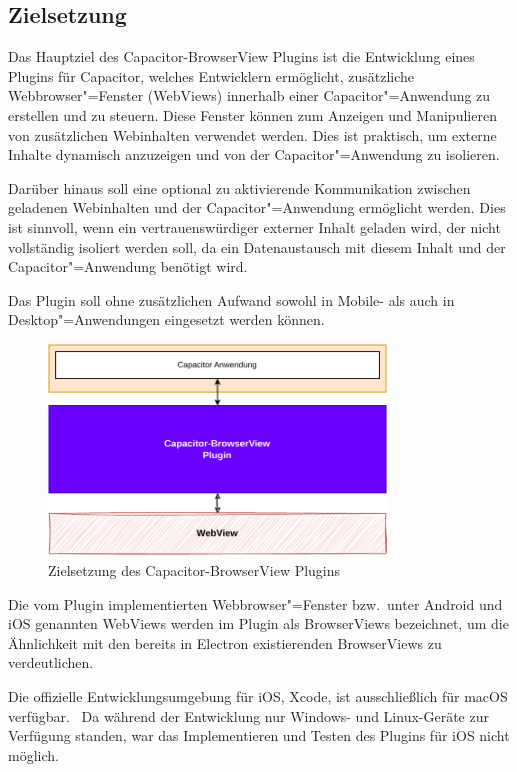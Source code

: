 \subsection{Zielsetzung}

Das Hauptziel des Capacitor-BrowserView Plugins ist die Entwicklung eines Plugins für Capacitor, welches Entwicklern ermöglicht, zusätzliche Webbrowser"=Fenster (WebViews) innerhalb einer Capacitor"=Anwendung zu erstellen und zu steuern.
Diese Fenster können zum Anzeigen und Manipulieren von zusätzlichen Webinhalten verwendet werden.
Dies ist praktisch, um externe Inhalte dynamisch anzuzeigen und von der Capacitor"=Anwendung zu isolieren.

Darüber hinaus soll eine optional zu aktivierende Kommunikation zwischen geladenen Webinhalten und der Capacitor"=Anwendung ermöglicht werden.
Dies ist sinnvoll, wenn ein vertrauenswürdiger externer Inhalt geladen wird, der nicht vollständig isoliert werden soll, da ein Datenaustausch mit diesem Inhalt und der Capacitor"=Anwendung benötigt wird.

Das Plugin soll ohne zusätzlichen Aufwand sowohl in Mobile- als auch in Desktop"=Anwendungen eingesetzt werden können.

\begin{figure}[H]
  \centering
  \includegraphics[width=0.8\textwidth]{assets/03_Capacitor-BrowserView/01_Zielsetzung.drawio.pdf}
  \caption[Capacitor-BrowserView / Zielsetzung]{Zielsetzung des Capacitor-BrowserView Plugins}
\end{figure}

Die vom Plugin implementierten Webbrowser"=Fenster bzw.\ unter Android und iOS genannten WebViews werden im Plugin als BrowserViews bezeichnet, um die Ähnlichkeit mit den bereits in Electron existierenden BrowserViews zu verdeutlichen.
\cite{android:api, ios:api, electron:docs}

\begin{note}
  Die offizielle Entwicklungsumgebung für iOS, Xcode, ist ausschließlich für macOS verfügbar.~\cite{xcode:support}
  Da während der Entwicklung nur Windows- und Linux-Geräte zur Verfügung standen, war das Implementieren und Testen des Plugins für iOS nicht möglich.
\end{note}
